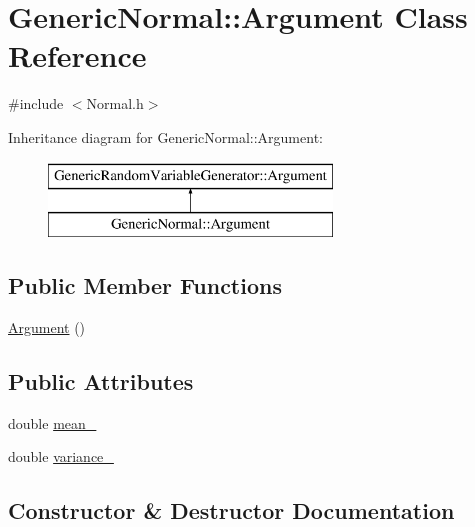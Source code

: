 \hypertarget{class_generic_normal_1_1_argument}{}\section{Generic\+Normal\+:\+:Argument Class Reference}
\label{class_generic_normal_1_1_argument}


{\ttfamily \#include $<$Normal.\+h$>$}

Inheritance diagram for Generic\+Normal\+:\+:Argument\+:\begin{figure}[H]
\begin{center}
\leavevmode
\includegraphics[height=2.000000cm]{class_generic_normal_1_1_argument}
\end{center}
\end{figure}
\subsection*{Public Member Functions}
\begin{DoxyCompactItemize}
\item 
\hyperlink{class_generic_normal_1_1_argument_abeb9e43c8b41714083aee28875ab7cb0}{Argument} ()
\end{DoxyCompactItemize}
\subsection*{Public Attributes}
\begin{DoxyCompactItemize}
\item 
double \hyperlink{class_generic_normal_1_1_argument_a2831c73fc24cfc71afc7045b47ef5d49}{mean\+\_\+}
\item 
double \hyperlink{class_generic_normal_1_1_argument_a95dbb3649aa02c89f3614ce0836e0596}{variance\+\_\+}
\end{DoxyCompactItemize}


\subsection{Constructor \& Destructor Documentation}
\hypertarget{class_generic_normal_1_1_argument_abeb9e43c8b41714083aee28875ab7cb0}{}\label{class_generic_normal_1_1_argument_abeb9e43c8b41714083aee28875ab7cb0} 
